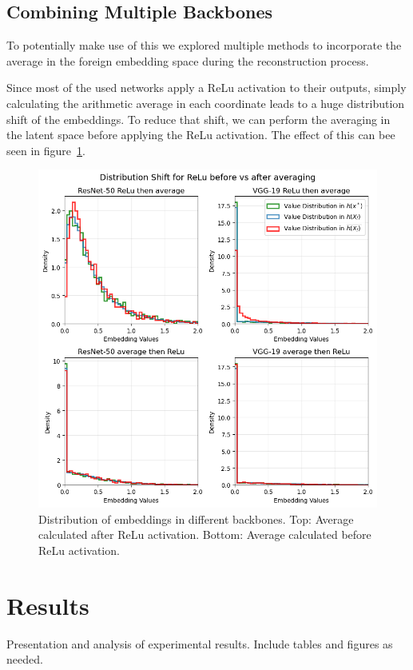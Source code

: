 \documentclass[10pt,twocolumn]{article}
\begin{document}
\subsection{Combining Multiple Backbones}
To potentially make use of this we explored multiple methods to incorporate the average in the foreign embedding space during the reconstruction process.

Since most of the used networks apply a ReLu activation to their outputs, simply calculating the arithmetic average in each coordinate leads to a huge distribution shift of the embeddings.
To reduce that shift, we can perform the averaging in the latent space before applying the ReLu activation.
The effect of this can bee seen in figure~\ref{fig:relu_norelu_distribution_shift}.

\begin{figure}[ht]
    \centering
    \includegraphics[width=\linewidth]{figures/relu-norelu-distribution-shift.png}
    \caption{
       Distribution of embeddings in different backbones.
       Top: Average calculated after ReLu activation.
       Bottom: Average calculated before ReLu activation.
    }
    \label{fig:relu_norelu_distribution_shift}
\end{figure}

\section{Results}
Presentation and analysis of experimental results. Include tables and figures as needed.
\end{document}
